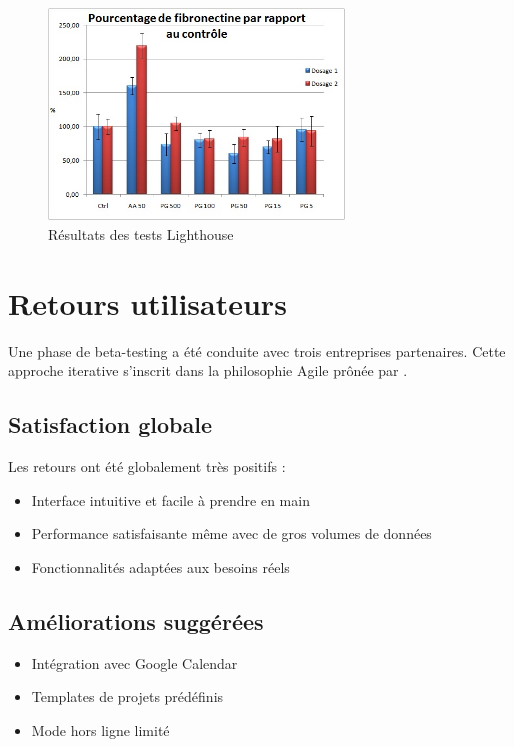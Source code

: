 \begin{figure}[H]
	\centering
	\includegraphics[width=0.7\textwidth]{images/resultats-graphique.jpg}
	\caption{Résultats des tests Lighthouse}
	\label{fig:lighthouse}
\end{figure}

\section{Retours utilisateurs}
Une phase de beta-testing a été conduite avec trois entreprises partenaires. Cette approche iterative s'inscrit dans la philosophie Agile prônée par \cite{martin2017clean}.

\subsection{Satisfaction globale}
Les retours ont été globalement très positifs :
\begin{itemize}
	\item Interface intuitive et facile à prendre en main
	\item Performance satisfaisante même avec de gros volumes de données
	\item Fonctionnalités adaptées aux besoins réels
\end{itemize}

\subsection{Améliorations suggérées}
\begin{itemize}
	\item Intégration avec Google Calendar
	\item Templates de projets prédéfinis
	\item Mode hors ligne limité
\end{itemize}


